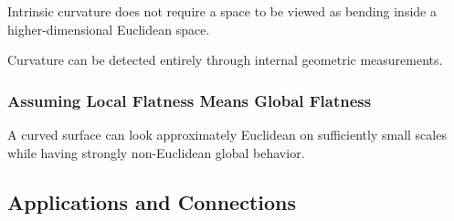 Intrinsic curvature does not require a space to be viewed as bending inside
a higher-dimensional Euclidean space.

Curvature can be detected entirely through internal geometric measurements.

\subsubsection{Assuming Local Flatness Means Global Flatness}

A curved surface can look approximately Euclidean on sufficiently small
scales while having strongly non-Euclidean global behavior.

\subsection{Applications and Connections}
\label{subsec:non-euclidean-applications}

